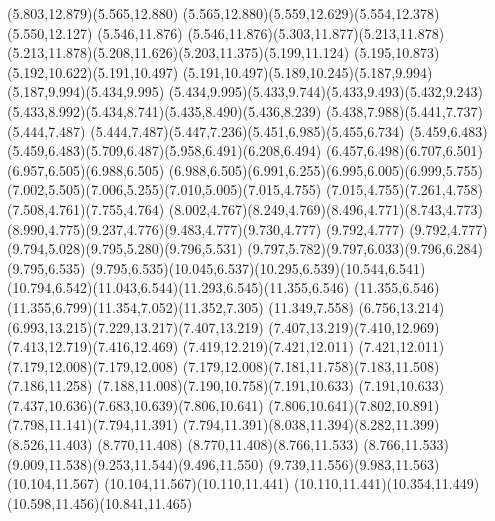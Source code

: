 \documentclass[10pt]{article}
\begin{document}
{{{(5.803,12.879)(5.565,12.880)\relax
{}(5.565,12.880)(5.559,12.629)(5.554,12.378)(5.550,12.127)%
(5.546,11.876)\relax
{}(5.546,11.876)(5.303,11.877)(5.213,11.878)\relax
{}(5.213,11.878)(5.208,11.626)(5.203,11.375)(5.199,11.124)%
(5.195,10.873)(5.192,10.622)(5.191,10.497)\relax
{}(5.191,10.497)(5.189,10.245)(5.187,9.994)\relax
{}(5.187,9.994)(5.434,9.995)\relax
{}(5.434,9.995)(5.433,9.744)(5.433,9.493)(5.432,9.243)%
(5.433,8.992)(5.434,8.741)(5.435,8.490)(5.436,8.239)%
(5.438,7.988)(5.441,7.737)(5.444,7.487)\relax
{}(5.444,7.487)(5.447,7.236)(5.451,6.985)(5.455,6.734)%
(5.459,6.483)\relax
{}(5.459,6.483)(5.709,6.487)(5.958,6.491)(6.208,6.494)%
(6.457,6.498)(6.707,6.501)(6.957,6.505)(6.988,6.505)%
\relax
{}(6.988,6.505)(6.991,6.255)(6.995,6.005)(6.999,5.755)%
(7.002,5.505)(7.006,5.255)(7.010,5.005)(7.015,4.755)%
\relax
{}(7.015,4.755)(7.261,4.758)(7.508,4.761)(7.755,4.764)%
(8.002,4.767)(8.249,4.769)(8.496,4.771)(8.743,4.773)%
(8.990,4.775)(9.237,4.776)(9.483,4.777)(9.730,4.777)%
(9.792,4.777)\relax
{}(9.792,4.777)(9.794,5.028)(9.795,5.280)(9.796,5.531)%
(9.797,5.782)(9.797,6.033)(9.796,6.284)(9.795,6.535)%
\relax
{}(9.795,6.535)(10.045,6.537)(10.295,6.539)(10.544,6.541)%
(10.794,6.542)(11.043,6.544)(11.293,6.545)(11.355,6.546)%
\relax
{}(11.355,6.546)(11.355,6.799)(11.354,7.052)(11.352,7.305)%
(11.349,7.558)\relax
{}(6.756,13.214)(6.993,13.215)(7.229,13.217)(7.407,13.219)%
\relax
{}(7.407,13.219)(7.410,12.969)(7.413,12.719)(7.416,12.469)%
(7.419,12.219)(7.421,12.011)\relax
{}(7.421,12.011)(7.179,12.008)(7.179,12.008)\relax
{}(7.179,12.008)(7.181,11.758)(7.183,11.508)(7.186,11.258)%
(7.188,11.008)(7.190,10.758)(7.191,10.633)\relax
{}(7.191,10.633)(7.437,10.636)(7.683,10.639)(7.806,10.641)%
\relax
{}(7.806,10.641)(7.802,10.891)(7.798,11.141)(7.794,11.391)%
\relax
{}(7.794,11.391)(8.038,11.394)(8.282,11.399)(8.526,11.403)%
(8.770,11.408)\relax
{}(8.770,11.408)(8.766,11.533)\relax
{}(8.766,11.533)(9.009,11.538)(9.253,11.544)(9.496,11.550)%
(9.739,11.556)(9.983,11.563)(10.104,11.567)\relax
{}(10.104,11.567)(10.110,11.441)\relax
{}(10.110,11.441)(10.354,11.449)(10.598,11.456)(10.841,11.465)%
}}}
\end{document}
